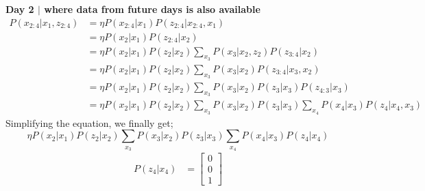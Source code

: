 \documentclass[answers]{exam}
\begin{document}
\begin{questions}
\begin{parts}
\begin{solution}
            \textbf{Day 2 $\mid$ where data from future days is also available}
            \begin{align*}
                P(x_{2:4} | x_1, z_{2:4}) & = \eta P(x_{2:4} | x_1) P(z_{2:4} | x_{2:4}, x_1)                                                                   \\
                                          & = \eta P(x_{2} | x_1) P(z_{2:4} | x_2)                                                                              \\
                                          & = \eta P(x_{2} | x_1) P(z_{2} | x_2) \sum_{x_3} P(x_3 | x_2, z_2) P(z_{3:4} | x_2)                                  \\
                                          & = \eta P(x_{2} | x_1) P(z_{2} | x_2) \sum_{x_3} P(x_3 | x_2) P(z_{3:4} | x_3, x_2)                                  \\
                                          & = \eta P(x_{2} | x_1) P(z_{2} | x_2) \sum_{x_3} P(x_3 | x_2) P(z_3 | x_3) P(z_{4:3} | x_3)                          \\
                                          & = \eta P(x_{2} | x_1) P(z_{2} | x_2) \sum_{x_3} P(x_3 | x_2) P(z_3 | x_3) \sum_{x_4} P(x_4 | x_3) P(z_4 | x_4, x_3)
            \end{align*}
            Simplifying the equation, we finally get;
            \begin{equation}
                \eta P(x_{2} | x_1) P(z_{2} | x_2) \sum_{x_3} P(x_3 | x_2) P(z_3 | x_3) \sum_{x_4} P(x_4 | x_3) P(z_4 | x_4)
            \end{equation}
            \begin{align*}
                P(z_4 | x_4)                                                                                    & = \begin{bmatrix}
                                                                                                                        0 \\
                                                                                                                        0 \\
                                                                                                                        1
                                                                                                                    \end{bmatrix}                                                                                                                                                                                                          \\

\end{align*}
\end{solution}
\end{parts}
\end{questions}
\end{document}
